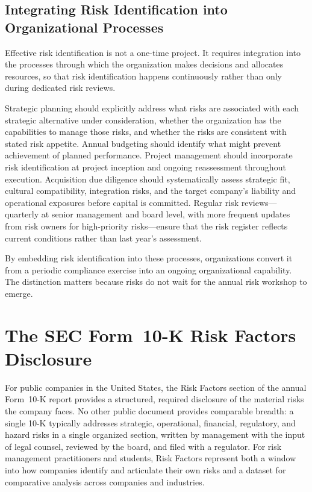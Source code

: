 \documentclass[11pt,openany]{book}
\begin{document}
\subsection{Integrating Risk Identification into Organizational Processes}
\label{subsec:integration}

Effective risk identification is not a one-time project. It requires integration into the processes through which the organization makes decisions and allocates resources, so that risk identification happens continuously rather than only during dedicated risk reviews.

Strategic planning should explicitly address what risks are associated with each strategic alternative under consideration, whether the organization has the capabilities to manage those risks, and whether the risks are consistent with stated risk appetite. Annual budgeting should identify what might prevent achievement of planned performance. Project management should incorporate risk identification at project inception and ongoing reassessment throughout execution. Acquisition due diligence should systematically assess strategic fit, cultural compatibility, integration risks, and the target company's liability and operational exposures before capital is committed. Regular risk reviews---quarterly at senior management and board level, with more frequent updates from risk owners for high-priority risks---ensure that the risk register reflects current conditions rather than last year's assessment.

By embedding risk identification into these processes, organizations convert it from a periodic compliance exercise into an ongoing organizational capability. The distinction matters because risks do not wait for the annual risk workshop to emerge.

\section{The SEC Form~10-K Risk Factors Disclosure}
\label{sec:10k-risk-factors}

For public companies in the United States, the Risk Factors section of the annual Form~10-K report provides a structured, required disclosure of the material risks the company faces. No other public document provides comparable breadth: a single 10-K typically addresses strategic, operational, financial, regulatory, and hazard risks in a single organized section, written by management with the input of legal counsel, reviewed by the board, and filed with a regulator. For risk management practitioners and students, Risk Factors represent both a window into how companies identify and articulate their own risks and a dataset for comparative analysis across companies and industries.
\end{document}
